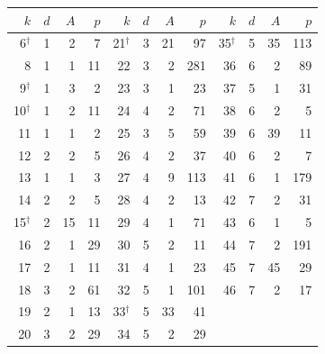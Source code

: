 \begin{tabular}{rrrr@{\qquad}rrrr@{\qquad}rrrr}
\toprule
\cellcolor{azul!14}$k$ & \cellcolor{azul!14}$d$ & \cellcolor{azul!14}$A$ & \cellcolor{azul!14}$p$ & \cellcolor{azul!14}$k$ & \cellcolor{azul!14}$d$ & \cellcolor{azul!14}$A$ & \cellcolor{azul!14}$p$ & \cellcolor{azul!14}$k$ & \cellcolor{azul!14}$d$ & \cellcolor{azul!14}$A$ & \cellcolor{azul!14}$p$\\
\midrule
\cellcolor{filacaliente}6$^\dagger$ & \cellcolor{filacaliente}1 & \cellcolor{filacaliente}2 & \cellcolor{filacaliente}7 & \cellcolor{filacaliente}21$^\dagger$ & \cellcolor{filacaliente}3 & \cellcolor{filacaliente}21 & \cellcolor{filacaliente}97 & \cellcolor{filacaliente}35$^\dagger$ & \cellcolor{filacaliente}5 & \cellcolor{filacaliente}35 & \cellcolor{filacaliente}113\\
8 & 1 & \cellcolor{azul!30}1 & 11 & 22 & 3 & \cellcolor{azul!22}2 & 281 & 36 & 6 & \cellcolor{azul!9}2 & 89\\
\cellcolor{filacaliente}9$^\dagger$ & \cellcolor{filacaliente}1 & \cellcolor{filacaliente}3 & \cellcolor{filacaliente}2 & 23 & 3 & \cellcolor{azul!15}1 & 23 & 37 & 5 & \cellcolor{azul!9}1 & 31\\
\cellcolor{filacaliente}10$^\dagger$ & \cellcolor{filacaliente}1 & \cellcolor{filacaliente}2 & \cellcolor{filacaliente}11 & 24 & 4 & \cellcolor{azul!15}2 & 71 & 38 & 6 & \cellcolor{azul!9}2 & 5\\
11 & 1 & \cellcolor{azul!30}1 & 2 & 25 & 3 & \cellcolor{azul!40}5 & 59 & 39 & 6 & \cellcolor{azul!40}39 & 11\\
12 & 2 & \cellcolor{azul!30}2 & 5 & 26 & 4 & \cellcolor{azul!15}2 & 37 & 40 & 6 & \cellcolor{azul!9}2 & 7\\
13 & 1 & \cellcolor{azul!30}1 & 3 & 27 & 4 & \cellcolor{azul!40}9 & 113 & 41 & 6 & \cellcolor{azul!5}1 & 179\\
14 & 2 & \cellcolor{azul!30}2 & 5 & 28 & 4 & \cellcolor{azul!15}2 & 13 & 42 & 7 & \cellcolor{azul!5}2 & 31\\
\cellcolor{filacaliente}15$^\dagger$ & \cellcolor{filacaliente}2 & \cellcolor{filacaliente}15 & \cellcolor{filacaliente}11 & 29 & 4 & \cellcolor{azul!9}1 & 71 & 43 & 6 & \cellcolor{azul!5}1 & 5\\
16 & 2 & \cellcolor{azul!22}1 & 29 & 30 & 5 & \cellcolor{azul!9}2 & 11 & 44 & 7 & \cellcolor{azul!5}2 & 191\\
17 & 2 & \cellcolor{azul!22}1 & 11 & 31 & 4 & \cellcolor{azul!9}1 & 23 & 45 & 7 & \cellcolor{azul!30}45 & 29\\
18 & 3 & \cellcolor{azul!22}2 & 61 & 32 & 5 & \cellcolor{azul!9}1 & 101 & 46 & 7 & \cellcolor{azul!5}2 & 17\\
19 & 2 & \cellcolor{azul!22}1 & 13 & \cellcolor{filacaliente}33$^\dagger$ & \cellcolor{filacaliente}5 & \cellcolor{filacaliente}33 & \cellcolor{filacaliente}41 &  & & & \\
20 & 3 & \cellcolor{azul!22}2 & 29 & 34 & 5 & \cellcolor{azul!9}2 & 29 &  & & & \\
\bottomrule
\end{tabular}
